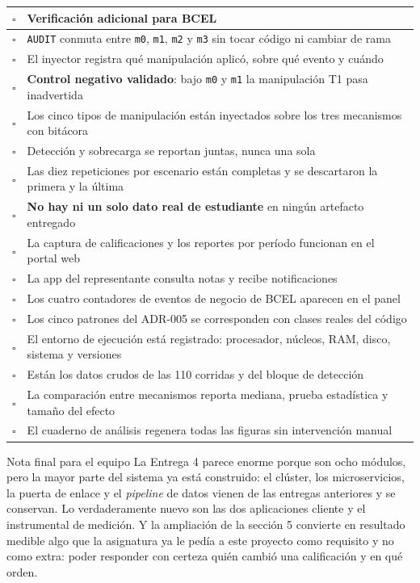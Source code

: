 \documentclass[11pt,a4paper]{article}
\begin{document}
\begin{center}
	\small
	\begin{tabular}{@{}p{0.7cm}p{14.2cm}@{}}
		\toprule
		\textbf{$\square$} & \textbf{Verificación adicional para BCEL} \\
		\midrule
		$\square$ & \texttt{AUDIT} conmuta entre \texttt{m0}, \texttt{m1}, \texttt{m2} y \texttt{m3} sin tocar código ni cambiar de rama \\
		$\square$ & El inyector registra qué manipulación aplicó, sobre qué evento y cuándo \\
		$\square$ & \textbf{Control negativo validado}: bajo \texttt{m0} y \texttt{m1} la manipulación T1 pasa inadvertida \\
		$\square$ & Los cinco tipos de manipulación están inyectados sobre los tres mecanismos con bitácora \\
		$\square$ & Detección y sobrecarga se reportan juntas, nunca una sola \\
		$\square$ & Las diez repeticiones por escenario están completas y se descartaron la primera y la última \\
		$\square$ & \textbf{No hay ni un solo dato real de estudiante} en ningún artefacto entregado \\
		$\square$ & La captura de calificaciones y los reportes por período funcionan en el portal web \\
		$\square$ & La app del representante consulta notas y recibe notificaciones \\
		$\square$ & Los cuatro contadores de eventos de negocio de BCEL aparecen en el panel \\
		$\square$ & Los cinco patrones del ADR-005 se corresponden con clases reales del código \\
		$\square$ & El entorno de ejecución está registrado: procesador, núcleos, RAM, disco, sistema y versiones \\
		$\square$ & Están los datos crudos de las 110 corridas y del bloque de detección \\
		$\square$ & La comparación entre mecanismos reporta mediana, prueba estadística y tamaño del efecto \\
		$\square$ & El cuaderno de análisis regenera todas las figuras sin intervención manual \\
		\bottomrule
	\end{tabular}
\end{center}

\vspace{6pt}
\begin{uteqbox}{Nota final para el equipo}
	La Entrega 4 parece enorme porque son ocho módulos, pero la mayor parte del sistema ya está construido: el clúster, los microservicios, la puerta de enlace y el \emph{pipeline} de datos vienen de las entregas anteriores y se conservan. Lo verdaderamente nuevo son las dos aplicaciones cliente y el instrumental de medición. Y la ampliación de la sección 5 convierte en resultado medible algo que la asignatura ya le pedía a este proyecto como requisito y no como extra: poder responder con certeza quién cambió una calificación y en qué orden.
\end{uteqbox}
\end{document}
